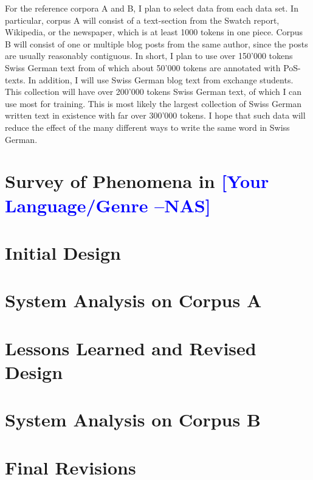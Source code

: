 \documentclass[11pt,letterpaper]{article}
\newcommand{\nascomment}[1]{\textcolor{blue}{\textbf{[#1 --NAS]}}}
\begin{document}
For the reference corpora A and B, I plan to select data from each data set. In particular, corpus A will consist of a text-section from the Swatch report, Wikipedia, or the newspaper, which is at least 1000 tokens in one piece. Corpus B will consist of one or multiple blog posts from the same author, since the posts are usually reasonably contiguous. In short, I plan to use over 150'000 tokens Swiss German text from \cite{AH14} of which about 50'000 tokens are annotated with PoS-texts. In addition, I will use Swiss German blog text from exchange students. This collection will have over 200'000 tokens Swiss German text, of which I can use most for training. This is most likely the largest collection of Swiss German written text in existence with far over 300'000 tokens. I hope that such data will reduce the effect of the many different ways to write the same word in Swiss German.

\section{Survey of Phenomena in \nascomment{Your Language/Genre}}


\section{Initial Design}

\section{System Analysis on Corpus A}

\section{Lessons Learned and Revised Design}

\section{System Analysis on Corpus B}

\section{Final Revisions}
\end{document}
